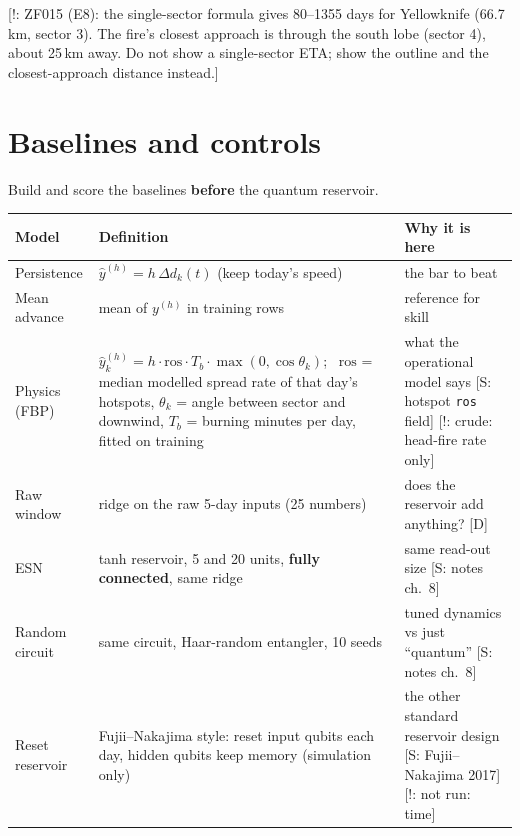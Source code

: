\documentclass[11pt,a4paper]{article}
\newcommand{\tagbox}[2]{{\footnotesize\color{#1}\textsf{[#2]}}}
\newcommand{\supp}[1]{\tagbox{ForestGreen!70!black}{S: #1}}  %
\newcommand{\ours}{\tagbox{NavyBlue}{D}}                      %
\newcommand{\caut}[1]{\tagbox{BrickRed}{!: #1}}               %
\newcommand{\code}[1]{\texttt{\small #1}}
\begin{document}
\caut{ZF015 (E8): the single-sector formula gives 80--1355 days for Yellowknife (66.7\,km, sector 3). The fire's
closest approach is through the south lobe (sector 4), about 25\,km away. Do not show a single-sector ETA; show the
outline and the closest-approach distance instead.}

\section{Baselines and controls}

\begin{teamrule}
Build and score the baselines \textbf{before} the quantum reservoir.
\end{teamrule}

\begin{center}\small
\begin{tabularx}{\linewidth}{@{}l Y Y@{}}
\toprule
\textbf{Model} & \textbf{Definition} & \textbf{Why it is here}\\
\midrule
Persistence & $\hat y^{(h)}=h\,\Delta d_k(t)$ (keep today's speed) & the bar to beat\\
Mean advance & mean of $y^{(h)}$ in training rows & reference for skill\\
Physics (FBP) & $\hat y^{(h)}_k=h\cdot\mathrm{ros}\cdot T_b\cdot\max(0,\cos\theta_k)$; \ $\mathrm{ros}$ = median modelled
spread rate of that day's hotspots, $\theta_k$ = angle between sector and downwind, $T_b$ = burning minutes per day,
fitted on training & what the operational model says \supp{hotspot \code{ros} field} \caut{crude: head-fire rate only}\\
Raw window & ridge on the raw 5-day inputs (25 numbers) & does the reservoir add anything? \ours\\
ESN & tanh reservoir, 5 and 20 units, \textbf{fully connected}, same ridge & same read-out size \supp{notes ch.~8}\\
Random circuit & same circuit, Haar-random entangler, 10 seeds & tuned dynamics vs just ``quantum''
\supp{notes ch.~8}\\
Reset reservoir & Fujii--Nakajima style: reset input qubits each day, hidden qubits keep memory (simulation only) &
the other standard reservoir design \supp{Fujii--Nakajima 2017} \caut{not run: time}\\
\bottomrule
\end{tabularx}
\end{center}
\end{document}
